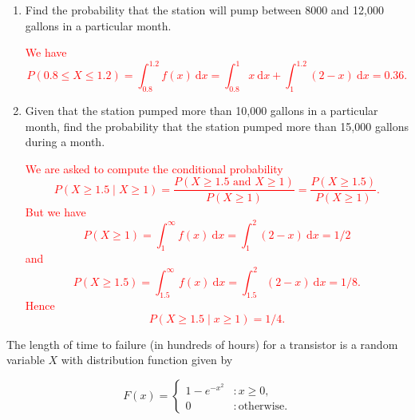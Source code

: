 \documentclass[12pt,reqno]{amsart}
\begin{document}
\medskip
\begin{enumerate}
    \item Find the probability that the station will pump between 8000 and 12,000 gallons in a particular month.
    
    \bigskip
    \textcolor{red}{We have
        \[P(0.8 \leq X \leq 1.2) = \int_{0.8}^{1.2}f(x) \ \text{d} x = \int_{0.8}^1 x \ \text{d} x + \int_1^{1.2}(2-x) \ \text{d} x = 0.36. \]}
    \bigskip

    \item Given that the station pumped more than 10,000 gallons in a particular month, find the probability that the station pumped more than 15,000 gallons during a month.
    
    \bigskip
    \textcolor{red}{We are asked to compute the conditional probability
        \[P(X\geq 1.5 \mid X\geq 1) = \frac{P(X\geq 1.5 \text{ and } X\geq 1)}{P(X\geq 1)} = \frac{P(X\geq 1.5)}{P(X\geq 1)}.\]
    But we have
        \[P(X\geq 1) = \int_1^\infty f(x) \ \text{d}x = \int_1^2(2-x) \ \text{d} x = 1/2\]
    and
        \[P(X\geq 1.5) = \int_{1.5}^\infty f(x) \ \text{d} x = \int_{1.5}^2 (2-x) \ \text{d} x = 1/8.\]
    Hence
        \[P(X\geq 1.5 \mid x\geq 1) = 1/4.\]}
\end{enumerate}









\bigskip
\prob The length of time to failure (in hundreds of hours) for a transistor is a random variable $X$ with
distribution function given by

    \[F(x) = \begin{cases}
        1 - e^{-x^2} & : x\geq 0, \\
        0 & : \text{otherwise}.
    \end{cases}\]
\end{document}
